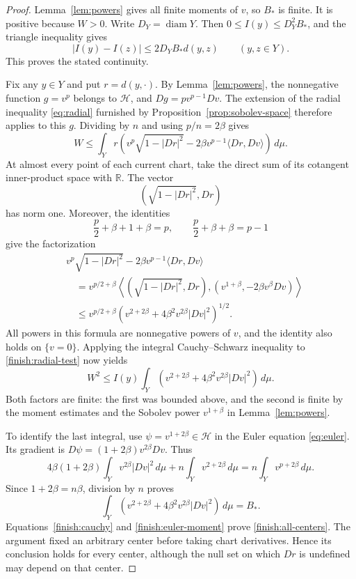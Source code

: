\documentclass[11pt]{article}
\numberwithin{equation}{section}
\theoremstyle{definition}
\theoremstyle{remark}
\begin{document}
\begin{proof}
Lemma~\ref{lem:powers} gives all finite moments of \(v\), so \(B_*\) is
finite. It is positive because \(W>0\). Write \(D_Y=\operatorname{diam} Y\). Then
\(0\le I(y)\le D_Y^2B_*\), and the triangle inequality gives
\[
 |I(y)-I(z)|\le2D_YB_*d(y,z)\qquad(y,z\in Y).
\]
This proves the stated continuity.

Fix any \(y\in Y\) and put \(r=d(y,\cdot)\). By
Lemma~\ref{lem:powers}, the nonnegative function \(g=v^p\) belongs to
\(\mathcal H\), and \(Dg=pv^{p-1}Dv\). The extension of the radial inequality
\eqref{eq:radial} furnished by Proposition~\ref{prop:sobolev-space}
therefore applies to this \(g\). Dividing by \(n\) and using
\(p/n=2\beta\) gives
\begin{equation}
 \label{finish:radial-test}
 W\le\int_Y r\left(v^p\sqrt{1-|Dr|^2}
             -2\beta v^{p-1}\langle Dr,Dv\rangle\right)\,d\mu.
\end{equation}
At almost every point of each current chart, take the direct sum of its
cotangent inner-product space with \(\mathbb R\). The vector
\[
 \left(\sqrt{1-|Dr|^2},Dr\right)
\]
has norm one. Moreover, the identities
\[
 \frac p2+\beta+1+\beta=p,
 \qquad
 \frac p2+\beta+\beta=p-1
\]
give the factorization
\begin{align*}
 &v^p\sqrt{1-|Dr|^2}-2\beta v^{p-1}\langle Dr,Dv\rangle\\
 &\quad=
 v^{p/2+\beta}
 \left\langle
   \left(\sqrt{1-|Dr|^2},Dr\right),
   \left(v^{1+\beta},-2\beta v^\beta Dv\right)
 \right\rangle\\
 &\quad\le
 v^{p/2+\beta}
 \left(v^{2+2\beta}+4\beta^2v^{2\beta}|Dv|^2\right)^{1/2}.
\end{align*}
All powers in this formula are nonnegative powers of \(v\), and the
identity also holds on \(\{v=0\}\). Applying the integral
Cauchy--Schwarz inequality to \eqref{finish:radial-test} now yields
\begin{equation}
 \label{finish:cauchy}
 W^2\le I(y)
 \int_Y\left(v^{2+2\beta}
             +4\beta^2v^{2\beta}|Dv|^2\right)\,d\mu.
\end{equation}
Both factors are finite: the first was bounded above, and the second is
finite by the moment estimates and the Sobolev power
\(v^{1+\beta}\) in Lemma~\ref{lem:powers}.

To identify the last integral, use
\(\psi=v^{1+2\beta}\in\mathcal H\) in the Euler equation
\eqref{eq:euler}. Its gradient is
\(D\psi=(1+2\beta)v^{2\beta}Dv\). Thus
\[
 4\beta(1+2\beta)\int_Yv^{2\beta}|Dv|^2\,d\mu
 +n\int_Yv^{2+2\beta}\,d\mu
 =n\int_Yv^{p+2\beta}\,d\mu.
\]
Since \(1+2\beta=n\beta\), division by \(n\) proves
\begin{equation}
 \label{finish:euler-moment}
 \int_Y\left(v^{2+2\beta}
             +4\beta^2v^{2\beta}|Dv|^2\right)\,d\mu=B_*.
\end{equation}
Equations~\eqref{finish:cauchy} and \eqref{finish:euler-moment}
prove \eqref{finish:all-centers}. The argument fixed an arbitrary center
before taking chart derivatives. Hence its conclusion holds for every
center, although the null set on which \(Dr\) is undefined may depend
on that center.


\end{proof}
\end{document}
